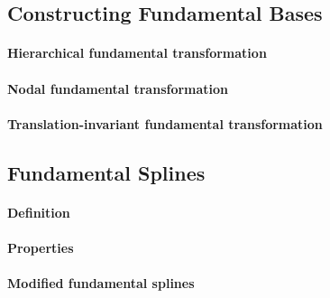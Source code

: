 \label{sec:44spatAdaptiveBFS}

\blindtext{}



\subsection{Constructing Fundamental Bases}
\label{sec:442constructingFundamentalBases}

\blindtext{}

\paragraph{Hierarchical fundamental transformation}

\blindtext{}

\paragraph{Nodal fundamental transformation}

\blindtext{}

\paragraph{Translation-invariant fundamental transformation}

\blindtext{}



\subsection{Fundamental Splines}
\label{sec:443fundamentalSplines}

\blindtext{}

\paragraph{Definition}

\blindtext{}

\paragraph{Properties}

\blindtext{}

\paragraph{Modified fundamental splines}

\blindtext{}
